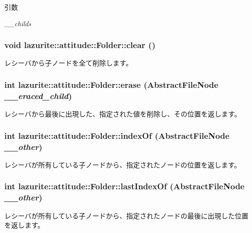 \begin{DoxyParams}{引数}
\item[{\em \_\-\_\-childs}]\end{DoxyParams}
\hypertarget{classlazurite_1_1attitude_1_1_folder_abdf37e15da03cd3b6507f445f115ff30}{
\subsubsection[{clear}]{\setlength{\rightskip}{0pt plus 5cm}void lazurite::attitude::Folder::clear ()}}
\label{classlazurite_1_1attitude_1_1_folder_abdf37e15da03cd3b6507f445f115ff30}
レシーバから子ノードを全て削除します。 \hypertarget{classlazurite_1_1attitude_1_1_folder_a49d1fc292192cb1d688c0e6a9ec0cb9b}{
\subsubsection[{erase}]{\setlength{\rightskip}{0pt plus 5cm}int lazurite::attitude::Folder::erase ({\bf AbstractFileNode} {\em \_\-\_\-eraced\_\-child})}}
\label{classlazurite_1_1attitude_1_1_folder_a49d1fc292192cb1d688c0e6a9ec0cb9b}
レシーバから最後に出現した、指定された値を削除し、その位置を返します。 \hypertarget{classlazurite_1_1attitude_1_1_folder_a21d564936cd21a6e23d02bfb135b76f8}{
\subsubsection[{indexOf}]{\setlength{\rightskip}{0pt plus 5cm}int lazurite::attitude::Folder::indexOf ({\bf AbstractFileNode} {\em \_\-\_\-other})}}
\label{classlazurite_1_1attitude_1_1_folder_a21d564936cd21a6e23d02bfb135b76f8}
レシーバが所有している子ノードから、指定されたノードの位置を返します。 \hypertarget{classlazurite_1_1attitude_1_1_folder_a0e18e28b51cf9d6135f8aa85765b8779}{
\subsubsection[{lastIndexOf}]{\setlength{\rightskip}{0pt plus 5cm}int lazurite::attitude::Folder::lastIndexOf ({\bf AbstractFileNode} {\em \_\-\_\-other})}}
\label{classlazurite_1_1attitude_1_1_folder_a0e18e28b51cf9d6135f8aa85765b8779}
レシーバが所有している子ノードから、指定されたノードの最後に出現した位置を返します。 

